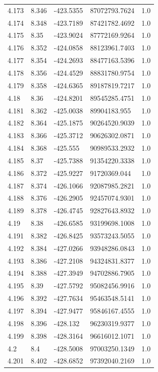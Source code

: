 \begin{tabular}{lllll}
4.173 & 8.346 & -423.5355 & 87072793.7624 & 1.0 \\
4.174 & 8.348 & -423.7189 & 87421782.4692 & 1.0 \\
4.175 & 8.35 & -423.9024 & 87772169.9264 & 1.0 \\
4.176 & 8.352 & -424.0858 & 88123961.7403 & 1.0 \\
4.177 & 8.354 & -424.2693 & 88477163.5396 & 1.0 \\
4.178 & 8.356 & -424.4529 & 88831780.9754 & 1.0 \\
4.179 & 8.358 & -424.6365 & 89187819.7217 & 1.0 \\
4.18 & 8.36 & -424.8201 & 89545285.4751 & 1.0 \\
4.181 & 8.362 & -425.0038 & 89904183.955 & 1.0 \\
4.182 & 8.364 & -425.1875 & 90264520.9039 & 1.0 \\
4.183 & 8.366 & -425.3712 & 90626302.0871 & 1.0 \\
4.184 & 8.368 & -425.555 & 90989533.2932 & 1.0 \\
4.185 & 8.37 & -425.7388 & 91354220.3338 & 1.0 \\
4.186 & 8.372 & -425.9227 & 91720369.044 & 1.0 \\
4.187 & 8.374 & -426.1066 & 92087985.2821 & 1.0 \\
4.188 & 8.376 & -426.2905 & 92457074.9301 & 1.0 \\
4.189 & 8.378 & -426.4745 & 92827643.8932 & 1.0 \\
4.19 & 8.38 & -426.6585 & 93199698.1008 & 1.0 \\
4.191 & 8.382 & -426.8425 & 93573243.5055 & 1.0 \\
4.192 & 8.384 & -427.0266 & 93948286.0843 & 1.0 \\
4.193 & 8.386 & -427.2108 & 94324831.8377 & 1.0 \\
4.194 & 8.388 & -427.3949 & 94702886.7905 & 1.0 \\
4.195 & 8.39 & -427.5792 & 95082456.9916 & 1.0 \\
4.196 & 8.392 & -427.7634 & 95463548.5141 & 1.0 \\
4.197 & 8.394 & -427.9477 & 95846167.4555 & 1.0 \\
4.198 & 8.396 & -428.132 & 96230319.9377 & 1.0 \\
4.199 & 8.398 & -428.3164 & 96616012.1071 & 1.0 \\
4.2 & 8.4 & -428.5008 & 97003250.1349 & 1.0 \\
4.201 & 8.402 & -428.6852 & 97392040.2169 & 1.0 \\

\end{tabular}
